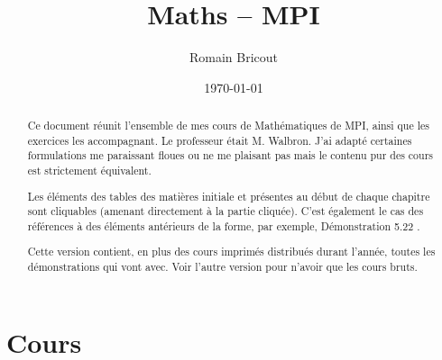 \documentclass[a4paper,12pt]{report}
\title{Maths -- MPI}
\author{Romain Bricout}
\date{\today}
\newcommand{\ds}{\displaystyle}
\theoremstyle{break}
\theoremstyle{break}
\theoremstyle{break}
\theoremstyle{break}
\theoremstyle{break}
\theoremstyle{break}
\theoremstyle{break}
\theoremstyle{break}
\theoremstyle{break}
\theoremstyle{break}
\theoremstyle{break}
\theoremstyle{break}
\theoremstyle{break}
\theoremstyle{break}
\theoremstyle{break}
\theoremstyle{break}
\theoremstyle{break}
\theoremstyle{break}
\theoremstyle{break}
\theoremstyle{break}
\theoremstyle{break}
\theoremstyle{break}
\theoremstyle{break}
\theoremstyle{break}
\theoremstyle{break}
\theoremstyle{break}
\theoremstyle{break}
\theoremstyle{break}
\theoremstyle{break}
\theoremstyle{break}
\newcommand{\guillemets}[1]{\og #1 \fg{}}
\begin{document}
\renewcommand{\labelitemi}{\(\triangleright\)}
\renewcommand{\labelenumi}{(\arabic{enumi})}

\everymath{\ds}

\maketitle

\begin{abstract}
Ce document réunit l'ensemble de mes cours de Mathématiques de MPI, ainsi que les exercices les accompagnant. Le professeur était M. Walbron. J'ai adapté certaines formulations me paraissant floues ou ne me plaisant pas mais le contenu pur des cours est strictement équivalent.

Les éléments des tables des matières initiale et présentes au début de chaque chapitre sont cliquables (amenant directement à la partie cliquée). C'est également le cas des références à des éléments antérieurs de la forme, par exemple, \guillemets{Démonstration 5.22}.

Cette version contient, en plus des cours imprimés distribués durant l'année, toutes les démonstrations qui vont avec. Voir l'autre version pour n'avoir que les cours bruts.
\end{abstract}

\dominitoc\tableofcontents

\part{Cours}


















\end{document}
